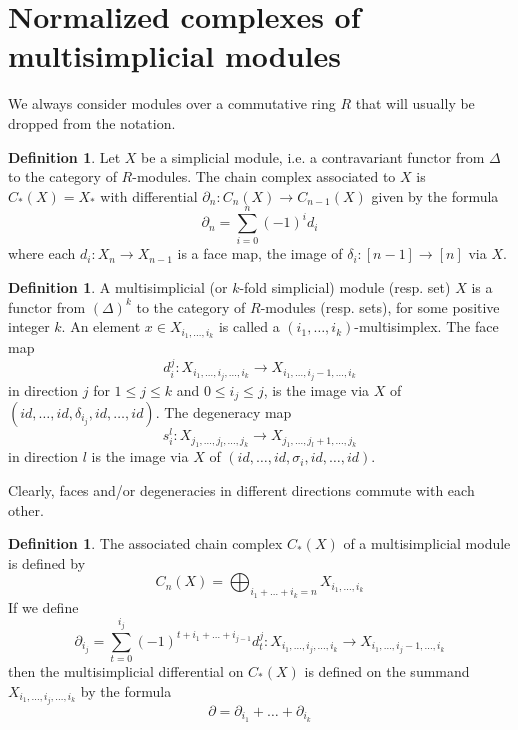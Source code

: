 \documentclass[a4paper,11pt]{article}
\theoremstyle{remark}
\theoremstyle{definition}
\newtheorem{definition}[theorem]{Definition}
\begin{document}
\section{Normalized complexes of multisimplicial modules}
We always consider modules over a commutative ring $R$ that will usually be dropped from the notation. 

\begin{definition}	
Let $X$ be a simplicial module, i.e. a contravariant functor from $\Delta$ to the category of $R$-modules.
The chain complex associated to $X$ is $C_{*}(X)=X_*$
with differential $\partial_{n}:C_{n}(X) \rightarrow C_{n-1}(X)$ given by the formula 
	\begin{equation*}
	\partial_{n}= \sum_{i=0}^{n} (-1)^{i} d_{i}
	\end{equation*}
where each $d_{i}:X_n \to X_{n-1}$ is a  face map, the image of $\delta_{i}:[n-1] \to [n]$ via $X$.
\end{definition}

\begin{definition}
A multisimplicial (or $k$-fold simplicial) module (resp. set) $X$ is a functor from $(\Delta)^{k}$ to the category of $R$-modules (resp. sets), for some positive integer $k$. An element $x \in X_{i_1,\dots,i_k}$ is called a $(i_1,\dots,i_k)$-multisimplex. 
The face map 
$$d_i^j:X_{i_1,\dots,i_j,\dots,i_k} \to X_{i_1,\dots,i_j-1,\dots,i_k}$$ in direction $j$ for $1 \leq j \leq k$
and $0 \leq i_j \leq j$, is the image via $X$ of $(id,\dots,id, \delta_{i_j},id, \dots,id)$. The degeneracy map $$s^l_i:X_{j_1,\dots,j_l, \dots,j_k} \to X_{j_1,\dots,j_l+1,\dots,j_k}$$ in direction $l$ is the image via $X$ of $(id, \dots,id,\sigma_i,id,\dots,id)$.
\end{definition}
 Clearly, faces and/or degeneracies in different directions commute with each other.



\begin{definition}
The associated chain complex $C_{*}(X)$ of a multisimplicial module is defined by
	\begin{equation*}
	C_{n}(X)= \bigoplus_{i_{1}+\dots +i_{k}=n}X_{i_{1},\dots,i_{k}}
	\end{equation*}
If we define
	\begin{equation*}
	\partial_{i_{j}}=\sum_{t=0}^{i_{j}} (-1)^{t+i_{1}+\dots+i_{j-1}}d^j_{t}: X_{i_{1},\dots,i_{j},\dots,i_{k}}\rightarrow X_{i_{1},\dots,i_{j}-1,\dots,i_{k}}
	\end{equation*}
then the multisimplicial differential on $C_{*}(X)$ is defined 
on the summand $X_{i_{1},\dots,i_{j},\dots,i_{k}}$
by the formula 
	\begin{equation*}
	\label{differenziale}
	\partial = \partial_{i_{1}}+\dots+\partial_{i_{k}}
	\end{equation*}
\end{definition}
\end{document}
